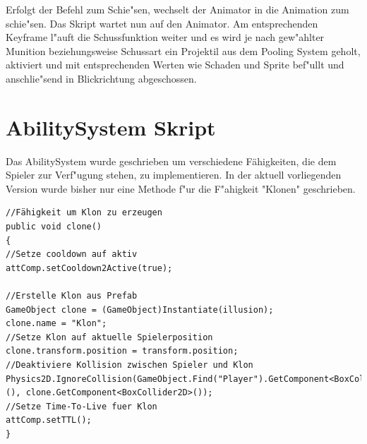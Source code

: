 Erfolgt der Befehl zum Schie"sen, wechselt der Animator in die Animation zum schie"sen. Das Skript wartet nun auf den Animator. Am entsprechenden Keyframe l"auft die Schussfunktion weiter und es wird je nach gew"ahlter Munition beziehungsweise Schussart ein Projektil aus dem Pooling System geholt, aktiviert und mit entsprechenden Werten wie Schaden und Sprite bef"ullt und anschlie"send in Blickrichtung abgeschossen.

\section{AbilitySystem Skript}
Das AbilitySystem wurde geschrieben um verschiedene Fähigkeiten, die dem Spieler zur Verf"ugung stehen, zu implementieren. In der aktuell vorliegenden Version wurde bisher nur eine Methode f"ur die F"ahigkeit "Klonen" geschrieben.
\begin{lstlisting}[breaklines=true]
//Fähigkeit um Klon zu erzeugen
public void clone()
{
//Setze cooldown auf aktiv
attComp.setCooldown2Active(true);

//Erstelle Klon aus Prefab
GameObject clone = (GameObject)Instantiate(illusion);
clone.name = "Klon";
//Setze Klon auf aktuelle Spielerposition
clone.transform.position = transform.position;
//Deaktiviere Kollision zwischen Spieler und Klon
Physics2D.IgnoreCollision(GameObject.Find("Player").GetComponent<BoxCollider2D>(), clone.GetComponent<BoxCollider2D>());
//Setze Time-To-Live fuer Klon
attComp.setTTL();
}
\end{lstlisting}